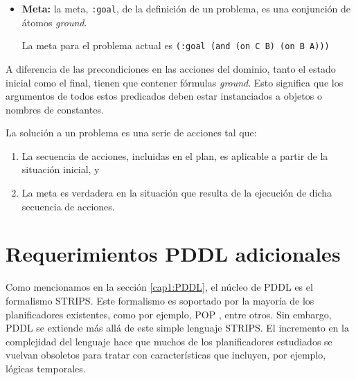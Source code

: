 \begin{itemize}
\begin{ejemplo}
\end{ejemplo}

\item {\bf Meta:} la meta, \texttt{:goal}, de la definici\'on de un problema, 
es una conjunci\'on de \'atomos \emph{ground}.

\begin{ejemplo}%

La meta para el problema actual es 
\texttt{(:goal (and (on C B) (on B A)))}

\end{ejemplo}

\end{itemize}

A diferencia de las precondiciones en las acciones del dominio, 
tanto el estado inicial como el final, tienen que contener f\'ormulas \emph{ground}. 
Esto significa que los argumentos de todos estos predicados deben estar 
instanciados a objetos o nombres de constantes.

La soluci\'on a un problema es una serie de acciones tal que:

\begin{enumerate}

	\item La secuencia de acciones, incluidas en el plan,
	es aplicable a partir de la situaci\'on inicial, y

	\item La meta es verdadera en la situaci\'on que 
	resulta de la ejecuci\'on de dicha secuencia de acciones.

\end{enumerate}



\section{Requerimientos PDDL adicionales} \label{gbraun:subpddl}

	Como mencionamos en la secci\'on \ref{cap1:PDDL}, el n\'ucleo de
	PDDL es el formalismo STRIPS. Este formalismo
	es soportado por la mayor\'ia de los planificadores existentes,
        como por ejemplo, POP \cite{gbraun:pop:1991}, entre otros.
	Sin embargo, PDDL se extiende m\'as all\'a de este simple lenguaje STRIPS.
	El incremento en la complejidad del lenguaje hace que muchos de los planificadores
	estudiados se vuelvan obsoletos para tratar con caracter\'isticas que incluyen, por
	ejemplo, l\'ogicas temporales.
	
